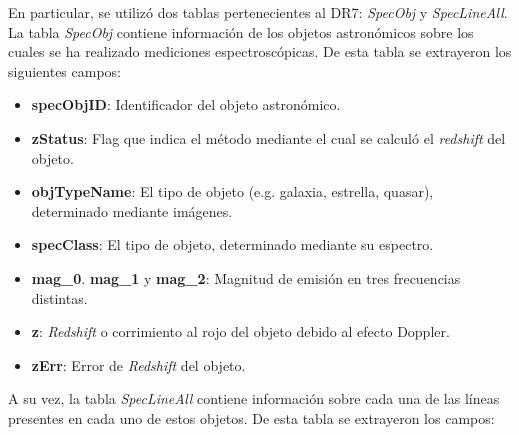 En particular, se utilizó dos tablas pertenecientes al DR7: \textit{SpecObj} y \textit{SpecLineAll}. La tabla \textit{SpecObj} contiene información de los objetos astronómicos sobre los cuales se ha realizado mediciones espectroscópicas. De esta tabla se extrayeron los siguientes campos:

\begin{itemize}
\item \textbf{specObjID}: Identificador del objeto astronómico.
\item \textbf{zStatus}: Flag que indica el método mediante el cual se calculó el \textit{redshift} del objeto.
\item \textbf{objTypeName}: El tipo de objeto (e.g. galaxia, estrella, quasar), determinado mediante imágenes.
\item \textbf{specClass}: El tipo de objeto, determinado mediante su espectro.
\item \textbf{mag\_0}. \textbf{mag\_1} y \textbf{mag\_2}: Magnitud de emisión en tres frecuencias distintas.
\item \textbf{z}: \textit{Redshift} o corrimiento al rojo del objeto debido al efecto Doppler.
\item \textbf{zErr}: Error de \textit{Redshift} del objeto.
\end{itemize}

A su vez, la tabla \textit{SpecLineAll} contiene información sobre cada una de las líneas presentes en cada uno de estos objetos. De esta tabla se extrayeron los campos:

